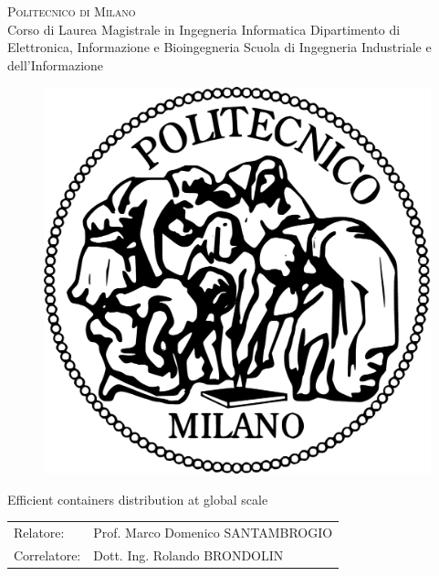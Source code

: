 



\thispagestyle{empty}
\enlargethispage{60mm}
\begin{center}
\Large{\textsc{Politecnico di Milano}}\\
\large{Corso di Laurea Magistrale in Ingegneria Informatica
Dipartimento di Elettronica, Informazione e Bioingegneria
Scuola di Ingegneria Industriale e dell’Informazione}\\
\vspace{7mm}
\begin{figure}[h]
\begin{center}
\includegraphics[scale=0.15]{gfx/logo}
\end{center}
\end{figure}
\vspace{2mm}

\begin{LARGE}
Efficient containers distribution at global scale
\end{LARGE}
\vspace{25mm}

\begin{flushleft}
\begin{tabular}{l l }
Relatore:    & Prof. Marco Domenico SANTAMBROGIO\\
Correlatore: & Dott. Ing. Rolando BRONDOLIN\\
\end{tabular}
\end{flushleft}
\vspace{25mm}


\end{center}
